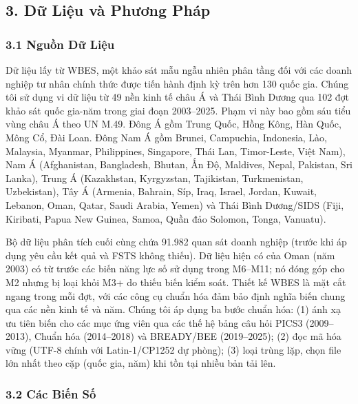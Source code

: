 \documentclass[12pt,a4paper]{article}
\begin{document}
\hypertarget{3-dux1eef-liux1ec7u-vuxe0-phux1b0ux1a1ng-phuxe1p}{%
\subsection{3. Dữ Liệu và Phương
Pháp}\label{3-dux1eef-liux1ec7u-vuxe0-phux1b0ux1a1ng-phuxe1p}}

\hypertarget{31-nguux1ed3n-dux1eef-liux1ec7u}{%
\subsubsection{3.1 Nguồn Dữ
Liệu}\label{31-nguux1ed3n-dux1eef-liux1ec7u}}

Dữ liệu lấy từ WBES, một khảo sát mẫu ngẫu nhiên phân tầng đối với các
doanh nghiệp tư nhân chính thức được tiến hành định kỳ trên hơn 130 quốc
gia. Chúng tôi sử dụng vi dữ liệu từ 49 nền kinh tế châu Á và Thái Bình
Dương qua 102 đợt khảo sát quốc gia-năm trong giai đoạn 2003--2025. Phạm
vi này bao gồm sáu tiểu vùng châu Á theo UN M.49. Đông Á gồm Trung Quốc,
Hồng Kông, Hàn Quốc, Mông Cổ, Đài Loan. Đông Nam Á gồm Brunei,
Campuchia, Indonesia, Lào, Malaysia, Myanmar, Philippines, Singapore,
Thái Lan, Timor-Leste, Việt Nam), Nam Á (Afghanistan, Bangladesh,
Bhutan, Ấn Độ, Maldives, Nepal, Pakistan, Sri Lanka), Trung Á
(Kazakhstan, Kyrgyzstan, Tajikistan, Turkmenistan, Uzbekistan), Tây Á
(Armenia, Bahrain, Síp, Iraq, Israel, Jordan, Kuwait, Lebanon, Oman,
Qatar, Saudi Arabia, Yemen) và Thái Bình Dương/SIDS (Fiji, Kiribati,
Papua New Guinea, Samoa, Quần đảo Solomon, Tonga, Vanuatu).

Bộ dữ liệu phân tích cuối cùng chứa 91.982 quan sát doanh nghiệp (trước
khi áp dụng yêu cầu kết quả và FSTS không thiếu). Dữ liệu hiện có của
Oman (năm 2003) có từ trước các biến năng lực số sử dụng trong M6--M11;
nó đóng góp cho M2 nhưng bị loại khỏi M3+ do thiếu biến kiểm soát. Thiết
kế WBES là mặt cắt ngang trong mỗi đợt, với các công cụ chuẩn hóa đảm
bảo định nghĩa biến chung qua các nền kinh tế và năm. Chúng tôi áp dụng
ba bước chuẩn hóa: (1) ánh xạ ưu tiên biến cho các mục ứng viên qua các
thế hệ bảng câu hỏi PICS3 (2009--2013), Chuẩn hóa (2014--2018) và
BREADY/BEE (2019--2025); (2) đọc mã hóa vững (UTF-8 chính với
Latin-1/CP1252 dự phòng); (3) loại trùng lặp, chọn file lớn nhất theo
cặp (quốc gia, năm) khi tồn tại nhiều bản tải lên.

\hypertarget{32-cuxe1c-biux1ebfn-sux1ed1}{%
\subsubsection{3.2 Các Biến Số}\label{32-cuxe1c-biux1ebfn-sux1ed1}}
\end{document}
